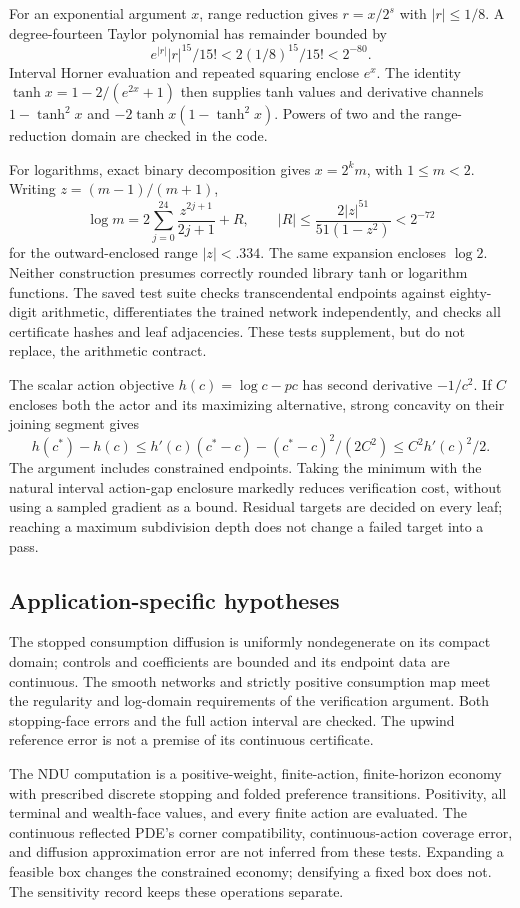 For an exponential argument $x$, range reduction gives $r=x/2^s$ with $|r|\leq1/8$. A degree-fourteen Taylor polynomial has remainder bounded by
\[
 e^{|r|}|r|^{15}/15!<2(1/8)^{15}/15!<2^{-80}.
\]
Interval Horner evaluation and repeated squaring enclose $e^x$. The identity $\tanh x=1-2/(e^{2x}+1)$ then supplies tanh values and derivative channels $1-\tanh^2x$ and $-2\tanh x(1-\tanh^2x)$. Powers of two and the range-reduction domain are checked in the code.

For logarithms, exact binary decomposition gives $x=2^km$, with $1\leq m<2$. Writing $z=(m-1)/(m+1)$,
\[
 \log m=2\sum_{j=0}^{24}\frac{z^{2j+1}}{2j+1}+R,
 \qquad |R|\leq\frac{2|z|^{51}}{51(1-z^2)}<2^{-72}
\]
for the outward-enclosed range $|z|<.334$. The same expansion encloses $\log2$. Neither construction presumes correctly rounded library tanh or logarithm functions. The saved test suite checks transcendental endpoints against eighty-digit arithmetic, differentiates the trained network independently, and checks all certificate hashes and leaf adjacencies. These tests supplement, but do not replace, the arithmetic contract.

The scalar action objective $h(c)=\log c-pc$ has second derivative $-1/c^2$. If $C$ encloses both the actor and its maximizing alternative, strong concavity on their joining segment gives
\[
 h(c^*)-h(c)\leq h'(c)(c^*-c)-(c^*-c)^2/(2C^2)
 \leq C^2h'(c)^2/2.
\]
The argument includes constrained endpoints. Taking the minimum with the natural interval action-gap enclosure markedly reduces verification cost, without using a sampled gradient as a bound. Residual targets are decided on every leaf; reaching a maximum subdivision depth does not change a failed target into a pass.

\subsection{Application-specific hypotheses}
The stopped consumption diffusion is uniformly nondegenerate on its compact domain; controls and coefficients are bounded and its endpoint data are continuous. The smooth networks and strictly positive consumption map meet the regularity and log-domain requirements of the verification argument. Both stopping-face errors and the full action interval are checked. The upwind reference error is not a premise of its continuous certificate.

The NDU computation is a positive-weight, finite-action, finite-horizon economy with prescribed discrete stopping and folded preference transitions. Positivity, all terminal and wealth-face values, and every finite action are evaluated. The continuous reflected PDE's corner compatibility, continuous-action coverage error, and diffusion approximation error are not inferred from these tests. Expanding a feasible box changes the constrained economy; densifying a fixed box does not. The sensitivity record keeps these operations separate.

